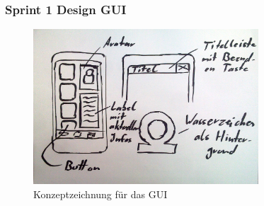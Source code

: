 \begin{frame}
	\frametitle{Sprint 1 Design GUI}

	\begin{figure}
		\centering
		\includegraphics[width = 0.75\textwidth]{gui-design}
		\caption{Konzeptzeichnung für das GUI}
	\end{figure}
\end{frame}
%
%
%
%

